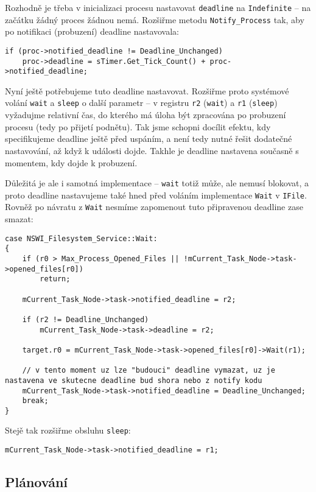 \documentclass{article}
\begin{document}
Rozhodně je třeba v inicializaci procesu nastavovat \texttt{deadline} na \texttt{Indefinite} -- na začátku žádný proces žádnou nemá. Rozšiřme metodu \texttt{Notify\_Process} tak, aby po notifikaci (probuzení) deadline nastavovala:
\begin{lstlisting}
if (proc->notified_deadline != Deadline_Unchanged)
	proc->deadline = sTimer.Get_Tick_Count() + proc->notified_deadline;
\end{lstlisting}

Nyní ještě potřebujeme tuto  deadline nastavovat. Rozšiřme proto systémové volání \texttt{wait} a \texttt{sleep} o další parametr -- v registru \texttt{r2} (\texttt{wait}) a \texttt{r1} (\texttt{sleep}) vyžadujme relativní čas, do kterého má úloha být zpracována po probuzení procesu (tedy po přijetí podnětu). Tak jsme schopni docílit efektu, kdy specifikujeme deadline ještě před uspáním, a není tedy nutné řešit dodatečné nastavování, až když k události dojde. Takhle je deadline nastavena současně s momentem, kdy dojde k probuzení.

Důležitá je ale i samotná implementace -- \texttt{wait} totiž může, ale nemusí blokovat, a proto deadline nastavujeme také hned před voláním implementace \texttt{Wait} v \texttt{IFile}. Rovněž po návratu z \texttt{Wait} nesmíme zapomenout tuto připravenou deadline zase smazat:
\begin{lstlisting}
case NSWI_Filesystem_Service::Wait:
{
	if (r0 > Max_Process_Opened_Files || !mCurrent_Task_Node->task->opened_files[r0])
		return;
	
	mCurrent_Task_Node->task->notified_deadline = r2;
	
	if (r2 != Deadline_Unchanged)
		mCurrent_Task_Node->task->deadline = r2;
	
	target.r0 = mCurrent_Task_Node->task->opened_files[r0]->Wait(r1);
	
	// v tento moment uz lze "budouci" deadline vymazat, uz je nastavena ve skutecne deadline bud shora nebo z notify kodu
	mCurrent_Task_Node->task->notified_deadline = Deadline_Unchanged;
	break;
}
\end{lstlisting}
Stejě tak rozšiřme obsluhu \texttt{sleep}:
\begin{lstlisting}
mCurrent_Task_Node->task->notified_deadline = r1;
\end{lstlisting}

\subsection{Plánování}
\end{document}
